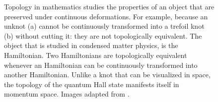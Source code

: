 \begin{figure}[!htb]
\begin{center}
%
\qquad
{}%
\caption{
Topology in mathematics studies the properties of an object that are preserved under continuous deformations.
For example, because an unknot (a) cannot be continuously transformed into a trefoil knot (b) without cutting it: they are not topologically equivalent.
The object that is studied in condensed matter physics, is the Hamiltonian.
Two Hamiltonians are topologically equivalent whenever an Hamiltonian can be continuously transformed into another Hamiltonian.
Unlike a knot that can be visualized in space, the topology of the quantum Hall state manifests itself in momentum space.
Images adapted from \cite{wiki_trefoil_knot,wiki_unknot}.
\label{fig:knots}}
\end{center}
\end{figure}

